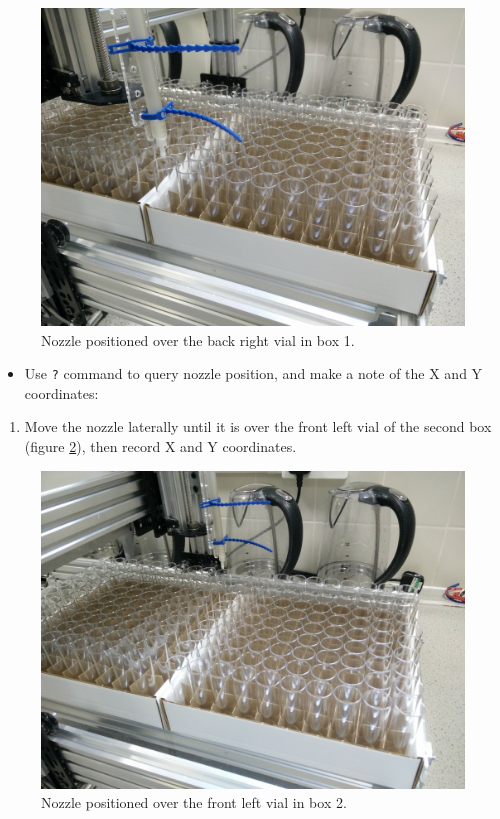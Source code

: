 \documentclass[
]{book}
\providecommand{\tightlist}{%
  \setlength{\itemsep}{0pt}\setlength{\parskip}{0pt}}
\begin{document}
\begin{figure}

{\centering \includegraphics[width=0.5\linewidth]{images/box1_last_vial} 

}

\caption{Nozzle positioned over the back right vial in box 1.}\label{fig:box1BackRight}
\end{figure}

\begin{itemize}
\tightlist
\item
  Use \texttt{?} command to query nozzle position, and make a note of the X and Y coordinates:
\end{itemize}

\begin{enumerate}
\def\labelenumi{\arabic{enumi}.}
\setcounter{enumi}{5}
\tightlist
\item
  Move the nozzle laterally until it is over the front left vial of the second box (figure \ref{fig:box2FrontLeft}), then record X and Y coordinates.
\end{enumerate}

\begin{figure}

{\centering \includegraphics[width=0.5\linewidth]{images/box2_first_vial} 

}

\caption{Nozzle positioned over the front left vial in box 2.}\label{fig:box2FrontLeft}
\end{figure}
\end{document}
